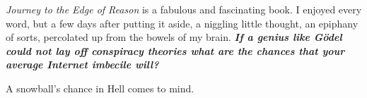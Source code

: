 
\emph{Journey to the Edge of Reason} is a fabulous and fascinating book.
I enjoyed every word, but a few days after putting it aside, a niggling
little thought, an epiphany of sorts, percolated up from the bowels of
my brain. \emph{\textbf{If a genius like Gödel could not lay off
conspiracy theories what are the chances that your average Internet
imbecile will?}}

A snowball's chance in Hell comes to mind.



%
 
 
 
